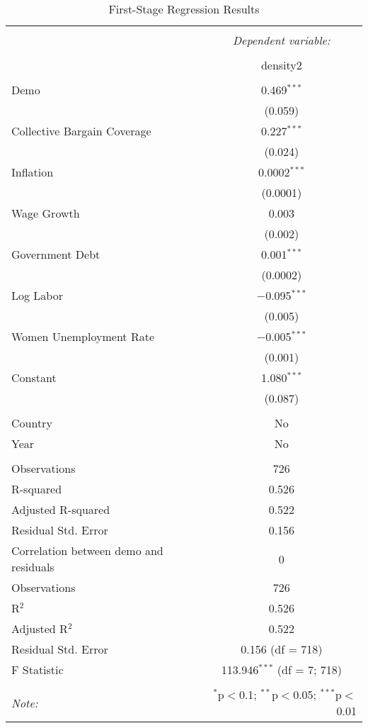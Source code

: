
\begin{table}[!htbp] \centering 
  \caption{First-Stage Regression Results} 
  \label{} 
\begin{tabular}{@{\extracolsep{5pt}}lc} 
\\[-1.8ex]\hline 
\hline \\[-1.8ex] 
 & \multicolumn{1}{c}{\textit{Dependent variable:}} \\ 
\cline{2-2} 
\\[-1.8ex] & density2 \\ 
\hline \\[-1.8ex] 
 Demo & 0.469$^{***}$ \\ 
  & (0.059) \\ 
  Collective Bargain Coverage & 0.227$^{***}$ \\ 
  & (0.024) \\ 
  Inflation & 0.0002$^{***}$ \\ 
  & (0.0001) \\ 
  Wage Growth & 0.003 \\ 
  & (0.002) \\ 
  Government Debt & 0.001$^{***}$ \\ 
  & (0.0002) \\ 
  Log Labor & $-$0.095$^{***}$ \\ 
  & (0.005) \\ 
  Women Unemployment Rate & $-$0.005$^{***}$ \\ 
  & (0.001) \\ 
  Constant & 1.080$^{***}$ \\ 
  & (0.087) \\ 
 \hline \\[-1.8ex] 
Country & No \\ 
Year & No \\ 
\hline \\[-1.8ex] 
Observations & 726 \\ 
R-squared & 0.526 \\ 
Adjusted R-squared & 0.522 \\ 
Residual Std. Error & 0.156 \\ 
Correlation between demo and residuals & 0 \\ 
Observations & 726 \\ 
R$^{2}$ & 0.526 \\ 
Adjusted R$^{2}$ & 0.522 \\ 
Residual Std. Error & 0.156 (df = 718) \\ 
F Statistic & 113.946$^{***}$ (df = 7; 718) \\ 
\hline 
\hline \\[-1.8ex] 
\textit{Note:}  & \multicolumn{1}{r}{$^{*}$p$<$0.1; $^{**}$p$<$0.05; $^{***}$p$<$0.01} \\ 
\end{tabular} 
\end{table} 
